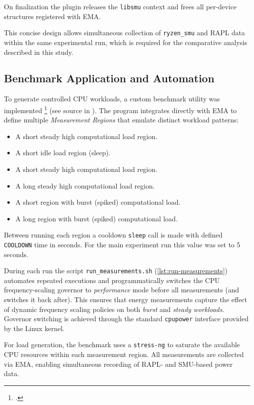 On finalization the plugin releases the \texttt{libsmu} context and
frees all per-device structures registered with \gls{EMA}.

This concise design allows simultaneous collection of \texttt{ryzen\_smu} and
\gls{RAPL} data within the same experimental run, which is required for the
comparative analysis described in this study.

\subsection{Benchmark Application and Automation}

To generate controlled \gls{CPU} workloads, a custom benchmark utility was
implemented \footcite{yahdzhyiev2025repo} (see source in
). The program integrates directly with \gls{EMA}
to define multiple \emph{Measurement Regions} that emulate distinct workload
patterns:

\begin{itemize}
  \item A short steady high computational load region.
  \item A short idle load region (sleep).
  \item A short steady high computational load region.
  \item A long steady high computational load region.
  \item A short region with burst (spiked) computational load.
  \item A long region with burst (spiked) computational load.
\end{itemize}

Between running each region a cooldown \texttt{sleep} call is made with
defined \texttt{COOLDOWN} time in seconds. For the main experiment run this
value was set to 5 seconds.

During each run the script \lstinline|run_measurements.sh|
(\cref{lst:run-measurements}) automates repeated executions and
programmatically switches the \gls{CPU} frequency-scaling governor to
\emph{performance} mode before all measurements (and switches it back after).
This ensures that energy measurements capture the effect of dynamic frequency
scaling policies on both \emph{burst} and \emph{steady workloads}. Governor
switching is achieved through the standard \texttt{cpupower} interface provided
by the Linux kernel.

For load generation, the benchmark uses a \texttt{stress-ng} \parencite{stress-ng}
to saturate the available CPU resources within each measurement region.
All measurements are collected via \gls{EMA}, enabling simultaneous recording of
\gls{RAPL}- and \gls{SMU}-based power data.

